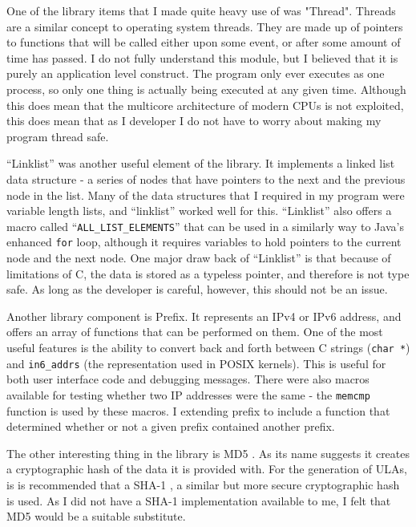 \documentclass[12pt]{report}
\begin{document}
One of the library items that I made quite heavy use of was "Thread". Threads 
are a similar concept to operating system threads. They are made up of pointers 
to functions that will be called either upon some event, or after some amount of 
time has passed. I do not fully understand this module, but I believed that it is 
purely an application level construct. The program only ever executes as one 
process, so only one thing is actually being executed at any given time. 
Although this does mean that the multicore architecture of modern CPUs 
 is not exploited, this does mean 
that as I developer I do not have to worry about making my program thread safe.

``Linklist'' was another useful element of the library. It implements a linked
list data structure - a series of nodes that have pointers to the next and the
previous node in the list. Many of the data structures that I required in my
program were variable length lists, and ``linklist'' worked well for this.
``Linklist'' also offers a macro called ``\texttt{ALL\_LIST\_ELEMENTS}'' that
can be used in a similarly way to Java's enhanced \texttt{for} loop, although it requires
variables to hold pointers to the current node and the next node. One major
draw back of ``Linklist'' is that because of limitations of C, the data is
stored as a typeless pointer, and therefore is not type safe. As long as the
developer is careful, however, this should not be an issue. 

Another library component is Prefix. It represents an IPv4 or IPv6 address, and
offers an array of functions that can be performed on them. One of the most
useful features is the ability to convert back and forth between C strings
(\texttt{char *}) and \texttt{in6\_addrs} (the representation used in POSIX
kernels). This is useful for both user interface code and debugging messages.
There were also macros available for testing whether two IP addresses were the
same - the \texttt{memcmp} function is used by these macros. I extending prefix
to include a function that determined whether or not a given prefix contained
another prefix. 

The other interesting thing in the library is MD5 
. As its name suggests it creates 
a cryptographic hash of  the data it is provided with. For the generation of 
ULAs, is is recommended that a SHA-1 
, a similar but more secure 
cryptographic hash is used. As I did not have a SHA-1 implementation available to
me, I felt that MD5 would be a suitable substitute. 
\end{document}
